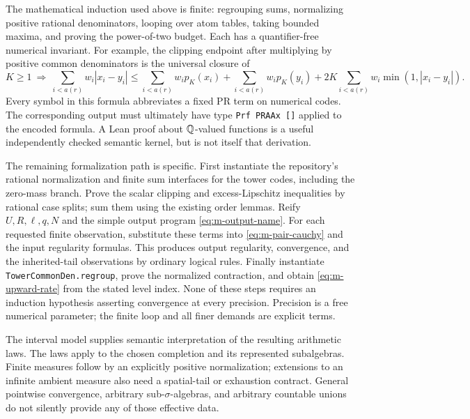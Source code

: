 The mathematical induction used above is finite: regrouping sums,
normalizing positive rational denominators, looping over atom tables,
taking bounded maxima, and proving the power-of-two budget.  Each has a
quantifier-free numerical invariant.  For example, the clipping endpoint
after multiplying by positive common denominators is the universal
closure of
\[
 K\ge1\ \Longrightarrow\
 \sum_{i<a(r)}w_i|x_i-y_i|
 \le\sum_{i<a(r)}w_ip_K(x_i)
    +\sum_{i<a(r)}w_ip_K(y_i)
    +2K\sum_{i<a(r)}w_i\min(1,|x_i-y_i|).
\]
Every symbol in this formula abbreviates a fixed PR term on numerical
codes.  The corresponding output must ultimately have type
\texttt{Prf PRAAx []} applied to the encoded formula.  A Lean proof about
$\mathbb Q$-valued functions is a useful independently checked semantic kernel,
but is not itself that derivation.

The remaining formalization path is specific.  First instantiate the
repository's rational normalization and finite sum interfaces for the
tower codes, including the zero-mass branch.  Prove the scalar clipping
and excess-Lipschitz inequalities by rational case splits; sum them using
the existing order lemmas.  Reify $U,R,\ell,q,N$ and the simple output
program \eqref{eq:m-output-name}.  For each requested finite observation,
substitute these terms into \eqref{eq:m-pair-cauchy} and the input
regularity formulas.  This produces output regularity, convergence, and
the inherited-tail observations by ordinary logical rules.  Finally
instantiate \texttt{TowerCommonDen.regroup}, prove the normalized
contraction, and obtain \eqref{eq:m-upward-rate} from the stated level
index.  None of these steps requires an induction hypothesis asserting
convergence at every precision.  Precision is a free numerical
parameter; the finite loop and all finer demands are explicit terms.

The interval model supplies semantic interpretation of the resulting
arithmetic laws.  The laws apply to the chosen completion and its
represented subalgebras.  Finite measures follow by an explicitly
positive normalization; extensions to an infinite ambient measure also
need a spatial-tail or exhaustion contract.  General pointwise
convergence, arbitrary sub-$\sigma$-algebras, and arbitrary countable
unions do not silently provide any of those effective data.
